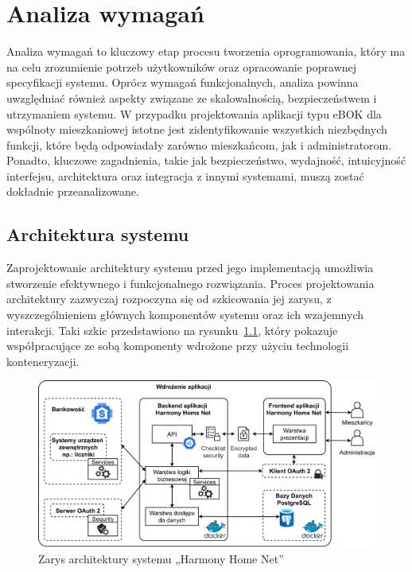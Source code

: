 \chapter{Analiza wymagań}
Analiza wymagań to kluczowy etap procesu tworzenia oprogramowania, który ma na celu zrozumienie potrzeb użytkowników oraz opracowanie poprawnej specyfikacji systemu. Oprócz wymagań funkcjonalnych, analiza powinna uwzględniać również aspekty związane ze skalowalnością, bezpieczeństwem i utrzymaniem systemu. W przypadku projektowania aplikacji typu eBOK dla wspólnoty mieszkaniowej istotne jest zidentyfikowanie wszystkich niezbędnych funkcji, które będą odpowiadały zarówno mieszkańcom, jak i administratorom. Ponadto, kluczowe zagadnienia, takie jak bezpieczeństwo, wydajność, intuicyjność interfejsu, architektura oraz integracja z innymi systemami, muszą zostać dokładnie przeanalizowane.

\section{Architektura systemu} 
Zaprojektowanie architektury systemu przed jego implementacją umożliwia stworzenie efektywnego i funkcjonalnego rozwiązania. Proces projektowania architektury zazwyczaj rozpoczyna się od szkicowania jej zarysu, z wyszczególnieniem głównych komponentów systemu oraz ich wzajemnych interakcji. Taki szkic przedstawiono na rysunku~\ref{fig:zarys_architektury}, 
który pokazuje współpracujące ze sobą komponenty wdrożone przy użyciu technologii konteneryzacji.

\begin{figure}[ht]
    \centering
    \includegraphics[width=\linewidth]{rys02/zarys_architektury}
    \caption{Zarys architektury systemu „Harmony Home Net”}
    \label{fig:zarys_architektury}
\end{figure}

